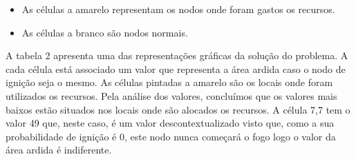 \documentclass[11pt]{article} %
\begin{document}
\begin{itemize}[$\ast$]
	\item As células a amarelo representam os nodos onde foram gastos os recursos.
    \item As células a branco são nodos normais.
\end{itemize}
A tabela 2 apresenta uma das representações gráficas da solução do problema. A cada célula está associado um valor que representa a área ardida caso o nodo de ignição seja o mesmo. As células pintadas a amarelo são os locais onde foram utilizados os recursos. Pela análise dos valores, concluímos que os valores mais baixos estão situados nos locais onde são alocados os recursos. A célula 7,7 tem o valor 49 que, neste caso, é um valor descontextualizado visto que, como a sua probabilidade de ignição é 0, este nodo nunca começará o fogo logo o valor da área ardida é indiferente.
\end{document}
